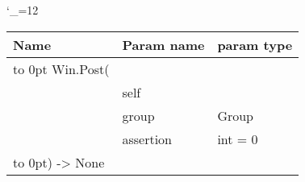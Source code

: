 \begingroup \catcode`\_=12 \tt
\begin{tabular}{lll}
\toprule
\textrm{Name}&\textrm{Param name}&\textrm{param type}\\
\midrule
\hbox to 0pt {Win.Post(\hss}\\
& self\\
& group & Group\\
& assertion & int = 0\\
\hbox to 0pt{) -> None\hss}\\
\bottomrule
\end{tabular}
\endgroup

